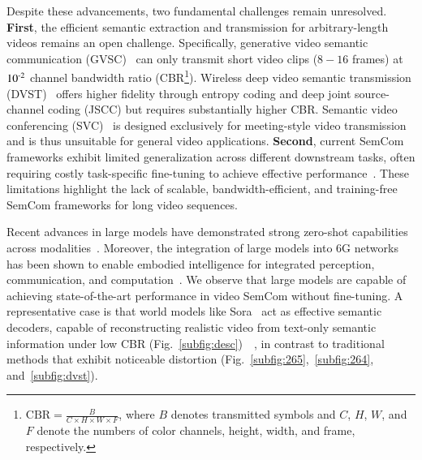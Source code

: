 \documentclass[10pt,journal]{IEEEtran}
\begin{document}
Despite these advancements, two fundamental challenges remain unresolved. \textbf{First}, the efficient semantic extraction and transmission for arbitrary-length videos remains an open challenge. Specifically, generative video semantic communication (GVSC)~\cite{yinYinhangGenerativeVideoSemantic2025} can only transmit short video clips ($8-16$ frames) at $10\textsuperscript{-2}$ channel bandwidth ratio (CBR\footnote{$\mathrm{CBR} = \frac{B}{C \times H \times W \times F}$, 
where $B$ denotes transmitted symbols and $C$, $H$, $W$, and $F$ denote the numbers of color channels, height, width, and frame, respectively.}). Wireless deep video semantic transmission (DVST)~\cite{wangDVSTWirelessDeepVideo2023} offers higher fidelity through entropy coding and deep joint source-channel coding (JSCC) but requires substantially higher CBR. Semantic video conferencing (SVC)~\cite{tongMultimodalSemanticCommunication2025} is designed exclusively for meeting-style video transmission and is thus unsuitable for general video applications.
\textbf{Second}, current SemCom frameworks exhibit limited generalization across different downstream tasks, often requiring costly task-specific fine-tuning to achieve effective performance~\cite{guoVideoQASCAdaptiveSemantic2025a}.
These limitations highlight the lack of scalable, bandwidth-efficient, and training-free SemCom frameworks for long video sequences.

Recent advances in large models have demonstrated strong zero-shot capabilities across modalities~\cite{qiaoTokenCommunicationsLarge2025}. Moreover, the integration of large models into 6G networks has been shown to enable embodied intelligence for integrated perception, communication, and computation~\cite{li2025large}. We observe that large models are capable of achieving state-of-the-art performance in video SemCom without fine-tuning. A representative case is that world models like Sora~\cite{liu2024sorareviewbackgroundtechnology} act as effective semantic decoders, capable of reconstructing realistic video from text-only semantic information under low CBR (Fig.~\ref{subfig:desc})~\cite{yinYinhangGenerativeVideoSemantic2025}~\cite{qiaoLatencyAwareGenerativeSemantic2024}, in contrast to traditional methods that exhibit noticeable distortion (Fig.~\ref{subfig:265},~\ref{subfig:264}, and~\ref{subfig:dvst}). 

  
\end{document}

